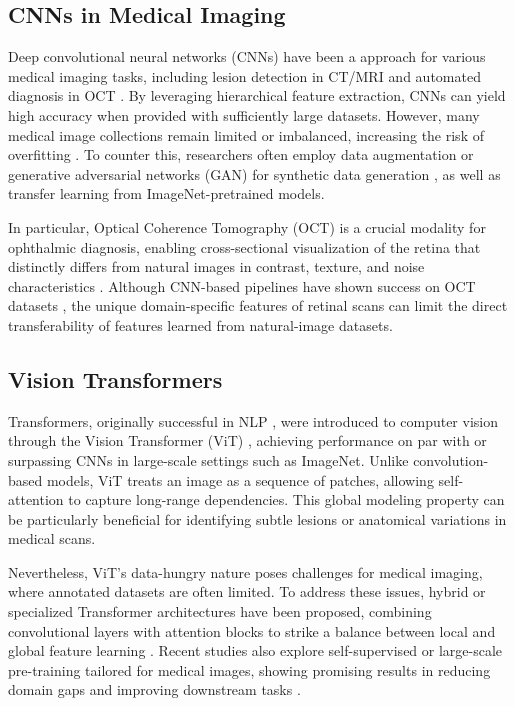 	\subsection{CNNs in Medical Imaging}
	Deep convolutional neural networks (CNNs) have been a approach for various medical imaging tasks, including lesion detection in CT/MRI \cite{29Litjens2017} and automated diagnosis in OCT \cite{30Esteva2017,16Kermany2018}. By leveraging hierarchical feature extraction, CNNs can yield high accuracy when provided with sufficiently large datasets. However, many medical image collections remain limited or imbalanced, increasing the risk of overfitting \cite{37Ran2021}. To counter this, researchers often employ data augmentation or generative adversarial networks (GAN) for synthetic data generation \cite{31Frid-Adar2018}, as well as transfer learning from ImageNet-pretrained models.
	
	In particular, Optical Coherence Tomography (OCT) is a crucial modality for ophthalmic diagnosis, enabling cross-sectional visualization of the retina that distinctly differs from natural images in contrast, texture, and noise characteristics \cite{35Nassif2004,38Abramoff2010}. Although CNN-based pipelines have shown success on OCT datasets \cite{16Kermany2018,41Ran2021}, the unique domain-specific features of retinal scans can limit the direct transferability of features learned from natural-image datasets.
	
	\subsection{Vision Transformers}
	Transformers, originally successful in NLP \cite{12Wang2018}, were introduced to computer vision through the Vision Transformer (ViT) \cite{10Dosovitskiy2020}, achieving performance on par with or surpassing CNNs in large-scale settings such as ImageNet. Unlike convolution-based models, ViT treats an image as a sequence of patches, allowing self-attention to capture long-range dependencies. This global modeling property can be particularly beneficial for identifying subtle lesions or anatomical variations in medical scans. 
	
	Nevertheless, ViT’s data-hungry nature poses challenges for medical imaging, where annotated datasets are often limited. To address these issues, hybrid or specialized Transformer architectures have been proposed, combining convolutional layers with attention blocks to strike a balance between local and global feature learning \cite{33Zhou2022}. Recent studies also explore self-supervised or large-scale pre-training tailored for medical images, showing promising results in reducing domain gaps and improving downstream tasks \cite{40Azizi2021}.
	
